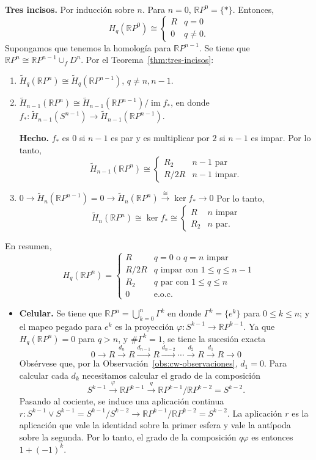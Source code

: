 \documentclass[11pt,a4paper]{article}
\theoremstyle{plain}
\theoremstyle{definition}
\theoremstyle{remark}
\newcommand{\RR}{\mathbb R}
\DeclareMathOperator{\im}{im}
\begin{document}
\begin{enumerate}[label=\arabic*.,leftmargin=*]
\begin{enumerate}[label=\alph*)]
\textbf{Tres incisos.} Por inducción sobre $n$. Para $n=0$, $\RR P^0=\{*\}$.
Entonces,
\[
H_q(\RR P^0)\cong\begin{cases}R & q=0\\0 & q\ne0.\end{cases}
\]
Supongamos que tenemos la homología para $\RR P^{n-1}$. Se tiene que
$\RR P^n\cong\RR P^{n-1}\cup_fD^n$. Por el Teorema~\ref{thm:tres-incisos}:
\begin{enumerate}[label=\arabic*)]
\item $\tilde H_q(\RR P^n)\cong\tilde H_q(\RR P^{n-1})$, $q\ne n,n-1$.
\item $\tilde H_{n-1}(\RR P^n)\cong\tilde H_{n-1}(\RR P^{n-1})/\im f_*$, en
donde $f_*:\tilde H_{n-1}(S^{n-1})\to\tilde H_{n-1}(\RR P^{n-1})$.

\textbf{Hecho.} $f_*$ es $0$ si $n-1$ es par y es multiplicar por $2$ si
$n-1$ es impar. Por lo tanto,
\[
\tilde H_{n-1}(\RR P^n)\cong\begin{cases}R_2 & n-1\text{ par}\\ R/2R & n-1\text{ impar.}\end{cases}
\]
\item $0\to\tilde H_n(\RR P^{n-1})=0\to\tilde H_n(\RR P^n)\xrightarrow{\cong}\ker f_*\to0$
Por lo tanto,
\[
\tilde H_n(\RR P^n)\cong\ker f_*\cong\begin{cases}R & n\text{ impar}\\ R_2 & n\text{ par.}\end{cases}
\]
\end{enumerate}
En resumen,
\[
H_q(\RR P^n)=\begin{cases}R & q=0\text{ o }q=n\text{ impar}\\ R/2R & q\text{ impar con }1\le q\le n-1\\ R_2 & q\text{ par con }1\le q\le n\\0 & \text{e.o.c.}\end{cases}
\]
\begin{itemize}
\item \textbf{Celular.} Se tiene que $\RR P^n=\bigcup_{k=0}^n\Gamma^k$ en
donde $\Gamma^k=\{e^k\}$ para $0\le k\le n$; y el mapeo pegado para $e^k$
es la proyección $\varphi:S^{k-1}\to\RR P^{k-1}$. Ya que $H_q(\RR P^n)=0$
para $q>n$, y $\#\Gamma^k=1$, se tiene la sucesión exacta
\[
0\to R\xrightarrow{d_n}R\xrightarrow{d_{n-1}}R\xrightarrow{d_{n-2}}\cdots\xrightarrow{d_2}R\xrightarrow{d_1}R\to0
\]
Obsérvese que, por la Observación~\ref{obs:cw-observaciones}, $d_1=0$.
Para calcular cada $d_k$ necesitamos calcular el grado de la composición
\[
S^{k-1}\xrightarrow{\varphi}\RR P^{k-1}\xrightarrow{q}\RR P^{k-1}/\RR P^{k-2}=S^{k-2}.
\]
Pasando al cociente, se induce una aplicación continua
$r:S^{k-1}\vee S^{k-1}=S^{k-1}/S^{k-2}\to\RR P^{k-1}/\RR P^{k-2}=S^{k-2}$.
La aplicación $r$ es la aplicación que vale la identidad sobre la primer
esfera y vale la antípoda sobre la segunda. Por lo tanto, el grado de la
composición $q\varphi$ es entonces $1+(-1)^k$.


\end{itemize}
\end{enumerate}
\end{enumerate}
\end{document}
